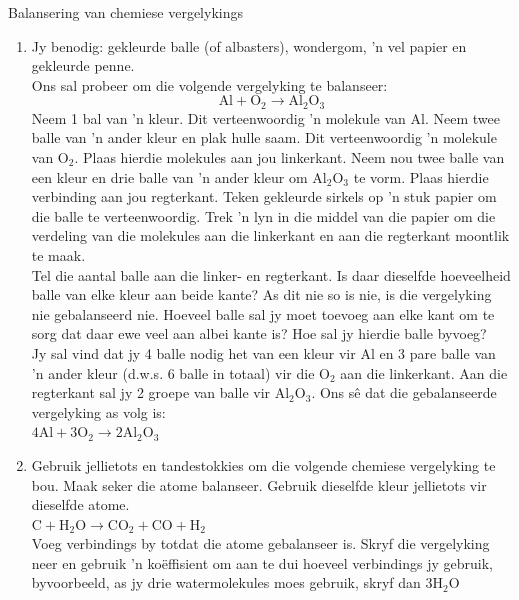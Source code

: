       \label{m38726*eip-619}
            \begin{activity}{Balansering van chemiese vergelykings}
            \nopagebreak
\begin{enumerate}[noitemsep, label=\textbf{\arabic*}]
\item            \label{m38726*eip-695}Jy benodig: gekleurde balle (of albasters), wondergom, 'n vel papier en gekleurde penne.\\
Ons sal probeer om die volgende vergelyking te balanseer:
\label{m38726*eid0342}\nopagebreak\noindent{}
    \begin{equation*}
    \text{Al}+{\text{O}}_{2}\to {\text{Al}}_{2}{\text{O}}_{3}
      \end{equation*}
Neem 1 bal van 'n kleur. Dit verteenwoordig 'n molekule van $\text{Al}$. Neem twee balle van 'n ander kleur en plak hulle saam. Dit verteenwoordig 'n molekule van ${\text{O}}_{2}$. Plaas hierdie molekules aan jou linkerkant. Neem nou twee balle van een kleur en drie balle van 'n ander kleur om ${\text{Al}}_{2}{\text{O}}_{3}$ te vorm. Plaas hierdie verbinding aan jou regterkant. Teken gekleurde sirkels op 'n stuk papier om die balle te verteenwoordig. Trek 'n lyn in die middel van die papier om die verdeling van die molekules aan die linkerkant en aan die regterkant moontlik te maak.\\
Tel die aantal balle aan die linker- en regterkant. Is daar dieselfde hoeveelheid balle van elke kleur aan beide kante? As dit nie so is nie, is  die vergelyking nie gebalanseerd nie. Hoeveel balle sal jy moet toevoeg aan elke kant om te sorg dat daar ewe veel aan albei kante is? Hoe sal jy hierdie balle byvoeg?\\
Jy sal vind dat jy  4 balle nodig het van een kleur vir $\text{Al}$ en 3 pare balle van 'n ander kleur (d.w.s. 6 balle in totaal) vir die ${\text{O}}_{2}$ aan die linkerkant. Aan die regterkant sal jy  2 groepe van balle vir ${\text{Al}}_{2}{\text{O}}_{3}$. Ons s\^{e} dat die  gebalanseerde vergelyking as volg is:\\
    $4\text{Al}+3{\text{O}}_{2}\to 2{\text{Al}}_{2}{\text{O}}_{3}$

\item Gebruik jellietots en tandestokkies om die volgende chemiese vergelyking te bou. Maak seker die atome balanseer. Gebruik dieselfde kleur jellietots vir dieselfde atome.\\
$\text{C} + {\text{H}}_{2}\text{O} \to {\text{CO}}_{2} + {\text{CO}} + \text{H}_{2}$ \\
Voeg verbindings by totdat die atome gebalanseer is. Skryf die vergelyking neer en gebruik 'n ko\"{e}ffisient om aan te dui hoeveel verbindings jy gebruik, byvoorbeeld, as jy drie watermolekules moes gebruik, skryf dan $3{\text{H}}_{2}\text{O}$ 


\end{enumerate}
\end{activity}

